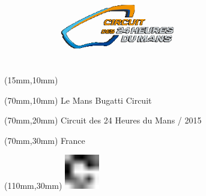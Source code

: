 \null\newpage
\begin{textblock*}{50mm}(15mm,10mm)%
\includegraphics[width=50mm]{LG/LEM.png}
\end{textblock*}
\begin{textblock*}{130mm}(70mm,10mm)%
{\fontsize{20}{20}\selectfont Le Mans Bugatti Circuit}\\
\end{textblock*}
\begin{textblock*}{120mm}(70mm,20mm)%
{\fontsize{16}{16}\selectfont Circuit des 24 Heures du Mans / 2015}\\
\end{textblock*}
\begin{textblock*}{120mm}(70mm,30mm)%
{\fontsize{12}{12}\selectfont France}
\end{textblock*}
\begin{textblock*}{30mm}(110mm,30mm)%
\centering
\includegraphics[height=15mm]{icons/fa-rotate-right.pdf}
\end{textblock*}
